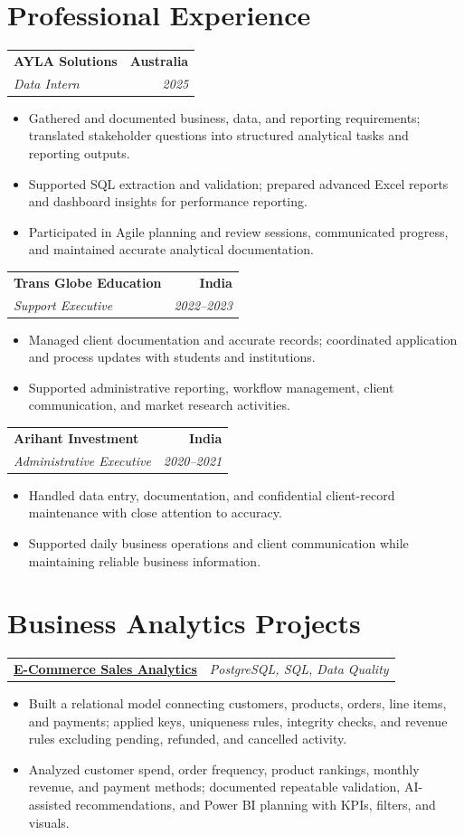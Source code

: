 \documentclass[letterpaper,10pt]{article}
\makeatletter
\newcommand{\role}[4]{%
  \begin{tabularx}{\textwidth}{@{}Xr@{}}
    \textbf{#1} & \textbf{#2} \\
    \textit{#3} & \textit{#4}
  \end{tabularx}\vspace{-1pt}
}
\newcommand{\project}[2]{%
  \begin{tabularx}{\textwidth}{@{}Xr@{}}
    \textbf{#1} & \textit{#2}
  \end{tabularx}\vspace{-1pt}
}
\makeatother
\begin{document}
\section{Professional Experience}
\role{AYLA Solutions}{Australia}{Data Intern}{2025}
\begin{itemize}
  \item Gathered and documented business, data, and reporting requirements; translated stakeholder questions into structured analytical tasks and reporting outputs.
  \item Supported SQL extraction and validation; prepared advanced Excel reports and dashboard insights for performance reporting.
  \item Participated in Agile planning and review sessions, communicated progress, and maintained accurate analytical documentation.
\end{itemize}
\vspace{1pt}

\role{Trans Globe Education}{India}{Support Executive}{2022--2023}
\begin{itemize}
  \item Managed client documentation and accurate records; coordinated application and process updates with students and institutions.
  \item Supported administrative reporting, workflow management, client communication, and market research activities.
\end{itemize}
\vspace{1pt}

\role{Arihant Investment}{India}{Administrative Executive}{2020--2021}
\begin{itemize}
  \item Handled data entry, documentation, and confidential client-record maintenance with close attention to accuracy.
  \item Supported daily business operations and client communication while maintaining reliable business information.
\end{itemize}

\section{Business Analytics Projects}
\project{\href{https://github.com/jainalimehta/Ecommerce-Sales-Analytics}{E-Commerce Sales Analytics}}{PostgreSQL, SQL, Data Quality}
\begin{itemize}
  \item Built a relational model connecting customers, products, orders, line items, and payments; applied keys, uniqueness rules, integrity checks, and revenue rules excluding pending, refunded, and cancelled activity.
  \item Analyzed customer spend, order frequency, product rankings, monthly revenue, and payment methods; documented repeatable validation, AI-assisted recommendations, and Power BI planning with KPIs, filters, and visuals.
\end{itemize}
\vspace{1pt}
\end{document}
